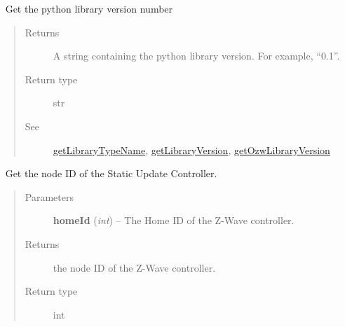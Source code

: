 \documentclass[letterpaper,10pt,english]{sphinxmanual}
\begin{document}
\begin{fulllineitems}
\begin{fulllineitems}
\begin{quote}
\begin{description}
\end{description}\end{quote}

\end{fulllineitems}


\begin{fulllineitems}
\label{libopenzwave:libopenzwave.PyManager.getPythonLibraryVersionNumber}~\label{libopenzwave:getpythonlibraryversionnumber}
Get the python library version number
\begin{quote}\begin{description}
\item[{Returns}] \leavevmode
A string containing the python library version. For example, ``0.1''.

\item[{Return type}] \leavevmode
str

\item[{See}] \leavevmode
{\hyperref[libopenzwave:getlibrarytypename]{getLibraryTypeName}}, {\hyperref[libopenzwave:getlibraryversion]{getLibraryVersion}}, {\hyperref[libopenzwave:getozwlibraryversion]{getOzwLibraryVersion}}

\end{description}\end{quote}

\end{fulllineitems}


\begin{fulllineitems}
\label{libopenzwave:libopenzwave.PyManager.getSUCNodeId}~\label{libopenzwave:getsucnodeid}
Get the node ID of the Static Update Controller.
\begin{quote}\begin{description}
\item[{Parameters}] \leavevmode
\textbf{homeId} (\emph{int}) -- The Home ID of the Z-Wave controller.

\item[{Returns}] \leavevmode
the node ID of the Z-Wave controller.

\item[{Return type}] \leavevmode
int

\end{description}\end{quote}


\end{fulllineitems}
\end{fulllineitems}
\end{document}
